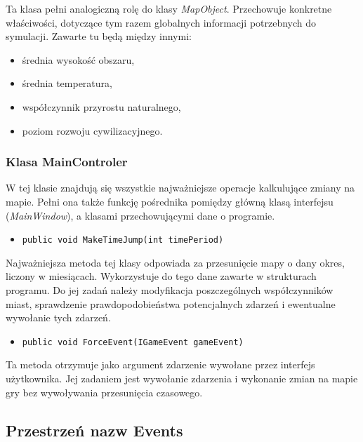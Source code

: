 \documentclass[a4paper,12pt]{article}
\newcommand\tab[1][0.6cm]{\hspace*{#1} }
\begin{document}
\tab Ta klasa pełni analogiczną rolę do klasy \textit{MapObject}. Przechowuje konkretne właściwości, dotyczące tym razem globalnych informacji potrzebnych do symulacji. Zawarte tu będą między innymi:

\begin{itemize}
\item średnia wysokość obszaru,
\item średnia temperatura,
\item współczynnik przyrostu naturalnego,
\item poziom rozwoju cywilizacyjnego.
\end{itemize}

\subsubsection{Klasa MainControler}


\tab W tej klasie znajdują się wszystkie najważniejsze operacje kalkulujące zmiany na mapie. Pełni ona także funkcję pośrednika pomiędzy główną klasą interfejsu (\textit{MainWindow}), a klasami przechowującymi dane o programie. 

\begin{itemize}
\item \begin{lstlisting}
public void MakeTimeJump(int timePeriod)
\end{lstlisting}
\end{itemize}

Najważniejsza metoda tej klasy odpowiada za przesunięcie mapy o dany okres, liczony w miesiącach. Wykorzystuje do tego dane zawarte w strukturach programu. Do jej zadań należy modyfikacja poszczególnych współczynników miast, sprawdzenie prawdopodobieństwa potencjalnych zdarzeń i ewentualne wywołanie tych zdarzeń.


\begin{itemize}
\item \begin{lstlisting}
public void ForceEvent(IGameEvent gameEvent)
\end{lstlisting}
\end{itemize}

Ta metoda otrzymuje jako argument zdarzenie wywołane przez interfejs użytkownika. Jej zadaniem jest wywołanie zdarzenia i wykonanie zmian na mapie gry bez wywoływania przesunięcia czasowego. 


\subsection{Przestrzeń nazw Events}
\end{document}
